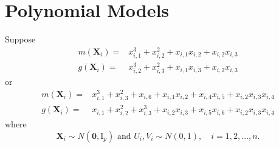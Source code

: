 \documentclass[en,12pt,mtpro2]{elegantpaper}
\begin{document}
\section{Polynomial Models}

Suppose
\begin{equation}
    \begin{aligned}
        m(\mathbf{X}_{i})= & x_{i,1}^{3}+x_{i,2}^{2}+x_{i,1}x_{i,2}+x_{i,2}x_{i,3} \\
        g(\mathbf{X}_{i})= & x_{i,2}^{3}+x_{i,3}^{2}+x_{i,1}x_{i,3}+x_{i,2}x_{i,3}
    \end{aligned}
    \label{eq:polynomial-model-1}
\end{equation}
or
\begin{equation}
    \begin{aligned}
        m(\mathbf{X}_{i})= & x_{i,1}^{3}+x_{i,3}^{2}+x_{i,6}+x_{i,1}x_{i,2}+x_{i,4}x_{i,5}+x_{i,2}x_{i,3}x_{i,4} \\
        g(\mathbf{X}_{i})= & x_{i,1}+x_{i,2}^{2}+x_{i,3}^{3}+x_{i,2}x_{i,3}+x_{i,5}x_{i,6}+x_{i,2}x_{i,3}x_{i,4}
    \end{aligned}
    \label{eq:polynomial-model-2}
\end{equation}
where
\begin{equation*}
    \mathbf{X}_{i}\sim N\left(\boldsymbol{0},\mathrm{I}_{p}\right)\text{ and }U_{i},V_{i}\sim N\left(0,1\right),\quad i=1,2,\ldots,n.
\end{equation*}
\end{document}
